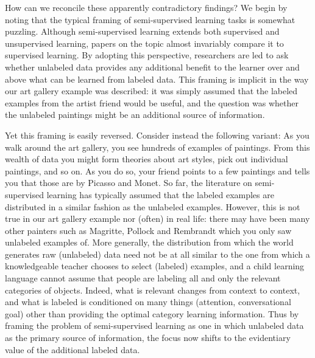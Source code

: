 \documentclass[a4paper, doc]{apa6}
\begin{document}
How can we reconcile these apparently contradictory findings? We begin by noting that the typical framing of semi-supervised learning tasks is somewhat puzzling. Although semi-supervised learning extends both supervised and unsupervised learning, papers on the topic almost invariably compare it to supervised learning. By adopting this perspective, researchers are led to ask whether unlabeled data provides any additional benefit to the learner over and above what can be learned from labeled data. This framing is implicit in the way our art gallery example was described: it was simply assumed that the labeled examples from the artist friend would be useful, and the question was whether the unlabeled paintings might be an additional source of information.

Yet this framing is easily reversed. Consider instead the following variant: As you walk around the art gallery, you see hundreds of examples of paintings. From this wealth of data you might form theories about art styles, pick out individual paintings, and so on. As you do so, your friend points to a few paintings and tells you that those are by Picasso and Monet. So far, the literature on semi-supervised learning has typically assumed that the labeled examples are distributed in a similar fashion as the unlabeled examples. However, this is not true in our art gallery example nor (often) in real life: there may have been many other painters such as Magritte, Pollock and Rembrandt which you only saw unlabeled examples of. More generally, the distribution from which the world generates raw (unlabeled) data need not be at all similar to the one from which a knowledgeable teacher chooses to select (labeled) examples, and a child learning language cannot assume that people are labeling all and only the relevant categories of objects. Indeed, what is relevant changes from context to context, and what is labeled is conditioned on many things (attention, conversational goal) other than providing the optimal category learning information. Thus by framing the problem of semi-supervised learning as one in which unlabeled data as the primary source of information, the focus now shifts to the evidentiary value of the additional labeled data.
\end{document}
